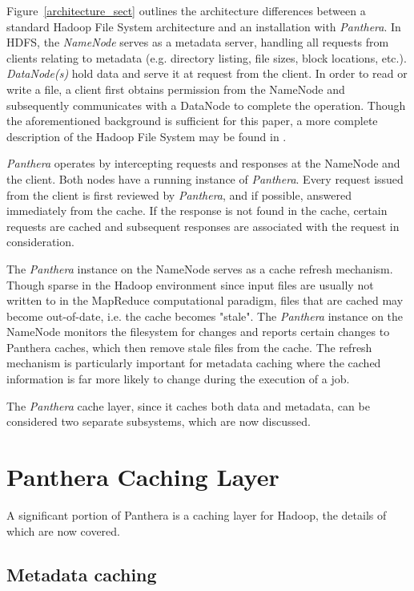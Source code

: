 \documentclass[12pt]{article}
\begin{document}
Figure~\ref{architecture_sect} outlines the architecture differences between a standard Hadoop File System architecture and an installation with \textit{Panthera}. In HDFS, the \textit{NameNode} serves as a metadata server, handling all requests from clients relating to metadata (e.g. directory listing, file sizes, block locations, etc.). \textit{DataNode(s)} hold data and serve it at request from the client. In order to read or write a file, a client first obtains permission from the NameNode and subsequently communicates with a DataNode to complete the operation. Though the aforementioned background is sufficient for this paper, a more complete description of the Hadoop File System may be found in \cite{hadoop}.

\textit{Panthera} operates by intercepting requests and responses at the NameNode and the client. Both nodes have a running instance of \textit{Panthera}. Every request issued from the client is first reviewed by \textit{Panthera}, and if possible, answered immediately from the cache. If the response is not found in the cache, certain requests are cached and subsequent responses are associated with the request in consideration.

The \textit{Panthera} instance on the NameNode serves as a cache refresh mechanism. Though sparse in the Hadoop environment since input files are usually not written to in the MapReduce computational paradigm, files that are cached may become out-of-date, i.e. the cache becomes "stale". The \textit{Panthera} instance on the NameNode monitors the filesystem for changes and reports certain changes to Panthera caches, which then remove stale files from the cache. The refresh mechanism is particularly important for metadata caching where the cached information is far more likely to change during the execution of a job.

The \textit{Panthera} cache layer, since it caches both data and metadata, can be considered two separate subsystems, which are now discussed.

\section{Panthera Caching Layer} \label{sect:caching_layer}
A significant portion of Panthera is a caching layer for Hadoop, the details of which are now covered. 
\subsection{Metadata caching} \label{sect:metadata_caching}
\end{document}
